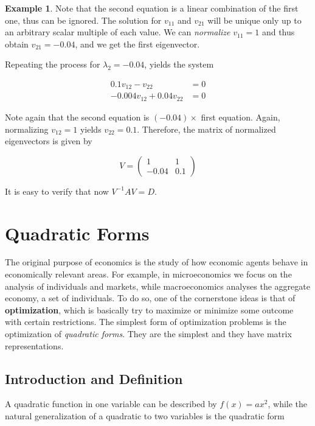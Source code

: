 \documentclass[a4paper,11pt]{article}
\theoremstyle{definition}
\newtheorem{example}{Example}
\theoremstyle{plain}
\begin{document}
\begin{example}
Note that the second equation is a linear combination of the first one,
thus can be ignored. The solution for \(v_{11}\) and \(v_{21}\) will be
unique only up to an arbitrary scalar multiple of each value. We can
\emph{normalize} \(v_{11} = 1\) and thus obtain \(v_{21} = -0.04\), and
we get the first eigenvector.

Repeating the process for \(\lambda_2 = -0.04\), yields the system

\begin{align*}
0.1 v_{12} - v_{22} &= 0 \\
-0.004 v_{12} + 0.04 v_{22} &= 0
\end{align*}

Note again that the second equation is \((-0.04)\times\) first equation.
Again, normalizing \(v_{12} = 1\) yields \(v_{22} = 0.1\). Therefore,
the matrix of normalized eigenvectors is given by

\[
V = \begin{pmatrix} 1 & 1 \\ -0.04 & 0.1 \end{pmatrix}
\]

It is easy to verify that now \(V^{-1}AV = D\).
\end{example}

\section{Quadratic Forms}\label{quadratic-forms}

The original purpose of economics is the study of how economic agents
behave in economically relevant areas. For example, in microeconomics we
focus on the analysis of individuals and markets, while macroeconomics
analyses the aggregate economy, a set of individuals. To do so, one of
the cornerstone ideas is that of \textbf{optimization}, which is
basically try to maximize or minimize some outcome with certain
restrictions. The simplest form of optimization problems is the
optimization of \emph{quadratic forms}. They are the simplest and they
have matrix representations.

\subsection{Introduction and
Definition}\label{introduction-and-definition}

A quadratic function in one variable can be described by
\(f(x) = ax^2\), while the natural generalization of a quadratic to two
variables is the quadratic form
\end{document}
